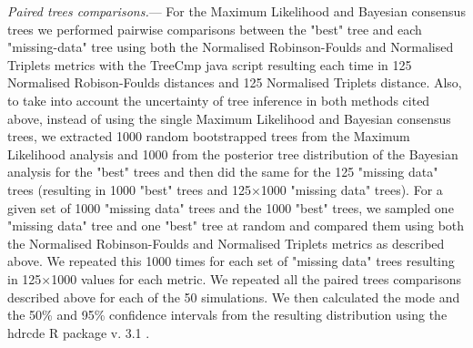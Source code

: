 \documentclass[12pt,letterpaper]{article}
\renewcommand{\subsubsection}[1]{%
\vspace{2ex}
\noindent
\textit{#1.}---}
\begin{document}
\subsubsection{Paired trees comparisons} %
\label{tree_comparisons}
For the Maximum Likelihood and Bayesian consensus
trees we performed pairwise comparisons between the "best" tree and each "missing-data" tree using both the Normalised Robinson-Foulds and Normalised Triplets metrics with the TreeCmp java script \citep{Bogdanowicz2012} resulting each time in 125 Normalised Robison-Foulds distances and 125 Normalised Triplets distance. %
Also, to take into account the uncertainty of tree inference in both methods cited above, instead of using the single Maximum Likelihood and Bayesian consensus trees, we extracted 1000 random bootstrapped trees from the Maximum Likelihood analysis and 1000 from the posterior tree distribution of the Bayesian analysis for the "best" trees and then did the same for the 125 "missing data" trees (resulting in 1000 "best" trees and 125$\times$1000 "missing data" trees). 
For a given set of 1000 "missing data" trees and the 1000 "best" trees, we sampled one "missing data" tree and one "best" tree at random and compared them using both the Normalised Robinson-Foulds and Normalised Triplets metrics as described above. We repeated this 1000 times for each set of "missing data" trees resulting in 125$\times$1000 values for each metric. We repeated all the paired trees comparisons described above for each of the 50 simulations. We then calculated the mode and the 50\% and 95\% confidence intervals from the resulting distribution using the hdrcde R package v. 3.1 \citep{hdrcde}. %
\end{document}
